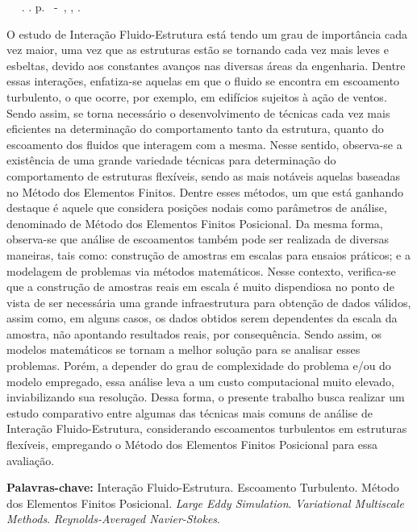 \documentclass[_ArquivoPrincipal.tex]{subfiles}
\begin{document}
	\setlength{\absparsep}{18pt} %
	\begin{resumo}
		\begin{flushleft} 
			\setlength{\absparsep}{0pt} %
			\SingleSpacing 
			\imprimirautorabr~ ~\textbf{\imprimirtitulo}.	\imprimirdata. \pageref{LastPage}p. 
			\imprimirtipotrabalho~-~\imprimirinstituicao, \imprimirlocal, \imprimirdata. 
		\end{flushleft}
		\OnehalfSpacing
		
		O estudo de Interação Fluido-Estrutura está tendo um grau de importância cada vez maior, uma vez que as estruturas estão se tornando cada vez mais leves e esbeltas, devido aos constantes avanços nas diversas áreas da engenharia. Dentre essas interações, enfatiza-se aquelas em que o fluido se encontra em escoamento turbulento, o que ocorre, por exemplo, em edifícios sujeitos à ação de ventos. Sendo assim, se torna necessário o desenvolvimento de técnicas cada vez mais eficientes na determinação do comportamento tanto da estrutura, quanto do escoamento dos fluidos que interagem com a mesma. Nesse sentido, observa-se a existência de uma grande variedade técnicas para determinação do comportamento de estruturas flexíveis, sendo as mais notáveis aquelas baseadas no Método dos Elementos Finitos. Dentre esses métodos, um que está ganhando destaque é aquele que considera posições nodais como parâmetros de análise, denominado de Método dos Elementos Finitos Posicional. Da mesma forma, observa-se que análise de escoamentos também pode ser realizada de diversas maneiras, tais como: construção de amostras em escalas para ensaios práticos; e a modelagem de problemas via métodos matemáticos. Nesse contexto, verifica-se que a construção de amostras reais em escala é muito dispendiosa no ponto de vista de ser necessária uma grande infraestrutura para obtenção de dados válidos, assim como, em alguns casos, os dados obtidos serem dependentes da escala da amostra, não apontando resultados reais, por consequência. Sendo assim, os modelos matemáticos se tornam a melhor solução para se analisar esses problemas. Porém, a depender do grau de complexidade do problema e/ou do modelo empregado, essa análise leva a um custo computacional muito elevado, inviabilizando sua resolução. Dessa forma, o presente trabalho busca realizar um estudo comparativo entre algumas das técnicas mais comuns de análise de Interação Fluido-Estrutura, considerando escoamentos turbulentos em estruturas flexíveis, empregando o Método dos Elementos Finitos Posicional para essa avaliação.
		
		\textbf{Palavras-chave:} Interação Fluido-Estrutura. Escoamento Turbulento. Método dos Elementos Finitos Posicional. \textit{Large Eddy Simulation}. \textit{Variational Multiscale Methods}. \textit{Reynolds-Averaged Navier-Stokes}.
	\end{resumo}
\end{document}
